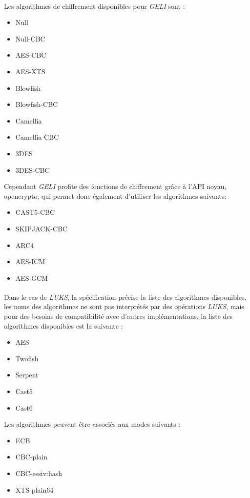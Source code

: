 \paragraph{}
Les algorithmes de chiffrement disponibles pour {\em GELI} \cite{geli.h} sont :
\begin{itemize}
	\item Null
	\item Null-CBC
	\item AES-CBC
	\item AES-XTS
	\item Blowfish
	\item Blowfish-CBC
	\item Camellia
	\item Camellia-CBC
	\item 3DES
	\item 3DES-CBC
\end{itemize}

Cependant {\em GELI} profite des fonctions de chiffrement grâce à l'API noyau,
opencrypto, qui permet donc également d'utiliser les algorithmes suivants:
\begin{itemize}
	\item{CAST5-CBC}
	\item{SKIPJACK-CBC}
	\item{ARC4}
	\item{AES-ICM}
	\item{AES-GCM}
\end{itemize}

\paragraph{}
Dans le cas de {\em LUKS}, la spécification \cite{onDiskFormatLuks} précise
la liste des algorithmes disponibles, les noms des algorithmes ne sont pas 
interprétés par des opérations {\em LUKS}, mais pour des besoins de 
compatibilité avec d'autres implémentations, la liste des algorithmes 
disponibles est la suivante :
\begin{itemize}
	\item AES
	\item Twofish
	\item Serpent
	\item Cast5
	\item Cast6
\end{itemize}
Les algorithmes peuvent être associés aux modes suivants :
\begin{itemize}
	\item ECB
	\item CBC-plain
	\item CBC-essiv:hash
	\item XTS-plain64
\end{itemize}

